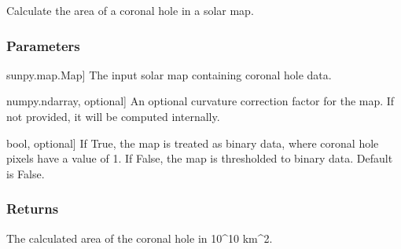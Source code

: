 \documentclass[letterpaper,10pt,english]{sphinxmanual}
\begin{document}

\begin{fulllineitems}
\label{\detokenize{pycatch/utils/ch_mapping:pycatch.utils.ch_mapping.ch_area}}
\pysigstartsignatures
{}
\pysigstopsignatures
\sphinxAtStartPar
Calculate the area of a coronal hole in a solar map.


\subsubsection{Parameters}
\label{\detokenize{pycatch/utils/ch_mapping:id7}}\begin{description}
\sphinxlineitem{map}{[}sunpy.map.Map{]}
\sphinxAtStartPar
The input solar map containing coronal hole data.

\sphinxlineitem{coreg}{[}numpy.ndarray, optional{]}
\sphinxAtStartPar
An optional curvature correction factor for the map. If not provided, it will be computed internally.

\sphinxlineitem{binary}{[}bool, optional{]}
\sphinxAtStartPar
If True, the map is treated as binary data, where coronal hole pixels have a value of 1. If False, the map is thresholded to binary data. Default is False.

\end{description}


\subsubsection{Returns}
\label{\detokenize{pycatch/utils/ch_mapping:id8}}\begin{description}
\sphinxAtStartPar
The calculated area of the coronal hole in 10\textasciicircum{}10 km\textasciicircum{}2.

\end{description}

\end{fulllineitems}

\end{document}
